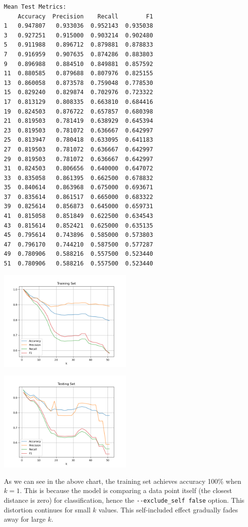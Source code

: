 \begin{verbatim}
Mean Test Metrics: 
    Accuracy  Precision    Recall        F1
1   0.947807   0.933036  0.952143  0.935038
3   0.927251   0.915000  0.903214  0.902480
5   0.911988   0.896712  0.879881  0.878833
7   0.916959   0.907635  0.874286  0.883803
9   0.896988   0.884510  0.849881  0.857592
11  0.880585   0.879688  0.807976  0.825155
13  0.860058   0.873578  0.759048  0.778530
15  0.829240   0.829874  0.702976  0.723322
17  0.813129   0.808335  0.663810  0.684416
19  0.824503   0.876722  0.657857  0.680398
21  0.819503   0.781419  0.638929  0.645394
23  0.819503   0.781072  0.636667  0.642997
25  0.813947   0.780418  0.633095  0.641183
27  0.819503   0.781072  0.636667  0.642997
29  0.819503   0.781072  0.636667  0.642997
31  0.824503   0.806656  0.640000  0.647072
33  0.835058   0.861395  0.662500  0.678832
35  0.840614   0.863968  0.675000  0.693671
37  0.835614   0.861517  0.665000  0.683322
39  0.825614   0.856873  0.645000  0.659731
41  0.815058   0.851849  0.622500  0.634543
43  0.815614   0.852421  0.625000  0.635135
45  0.795614   0.743896  0.585000  0.573803
47  0.796170   0.744210  0.587500  0.577287
49  0.780906   0.588216  0.557500  0.523440
51  0.780906   0.588216  0.557500  0.523440
\end{verbatim}

\includegraphics[width=0.5\textwidth]{./figures/knn_parkinsons_training_False.png}

\includegraphics[width=0.5\textwidth]{./figures/knn_parkinsons_testing_False.png}


As we can see in the above chart, the training set achieves accuracy 100\% when $k=1$.
This is because the model is comparing a data point itself (the closest distance is zero) for
classification, hence the \verb|--exclude_self false| option.
This distortion continues for small $k$ values.
This self-included effect gradually fades away for large $k$.

